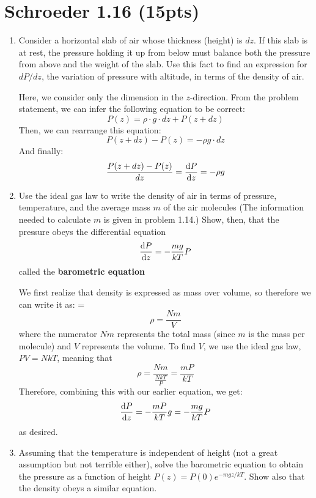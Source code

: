 \documentclass[11pt]{article}
\begin{document}
	\section*{Schroeder 1.16 (15pts)}
	\begin{enumerate}[label=\alph*)]
		\item Consider a horizontal slab of air whose thickness (height) is $dz$. If this slab is at rest, 
			the pressure holding it up from below must balance both the pressure from above and the weight 
			of the slab. Use this fact to find an expression for $dP / dz$, the variation of pressure with
			altitude, in terms of the density of air. 

			\begin{solution}
				Here, we consider only the dimension in the $z$-direction. From the problem statement, we can 
				infer the following equation to be correct:
				\[
				P(z) = \rho \cdot g \cdot dz + P(z + dz)
				\] 
				Then, we can rearrange this equation:
				\[
				P(z + dz) - P(z) = - \rho g \cdot dz
				\] 
				And finally:
				\[
					\frac{P(z + dz) - P(z)}{dz} = \dv{P}{z} =  -\rho g
				\] 
			\end{solution}
		\item Use the ideal gas law to write the density of air in terms of pressure, temperature, and the 
			average mass $m$ of the air molecules (The information needed to calculate $m$ is given 
			in problem 1.14.) Show, then, that the pressure obeys the differential equation 
			\[
				\dv{P}{z} = -\frac{mg}{kT}P
			\] 
			called the \textbf{barometric equation}

			\begin{solution}
				We first realize that density is expressed as mass over volume, so therefore we can 
				write it as: =
				\[
				\rho = \frac{Nm}{V}
				\] 
				where the numerator $Nm$ represents the total mass (since $m$ is the mass per molecule) and $V$
				represents the volume. To find $V$, we use the ideal gas law, $PV = NkT$, meaning that 
				\[
				\rho = \frac{Nm}{\frac{NkT}{P}} = \frac{mP}{kT}
				\] 
				Therefore, combining this with our earlier equation, we get:
				\[
					\dv{P}{z} = -\frac{mP}{kT}g = -\frac{mg}{kT}P
				\] 
				as desired.
			\end{solution}
		\item Assuming that the temperature is independent of height (not a great assumption but not terrible
			either), solve the barometric equation to obtain the pressure as a function of height $P(z) = 
			P(0) e^{-mgz / kT}$. Show also that the density obeys a similar equation.


\end{enumerate}
\end{document}
